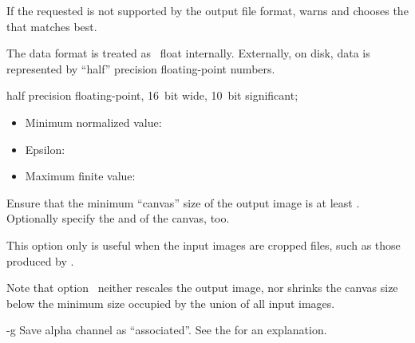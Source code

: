 \begin{codelist}
  If the requested  is not supported by the output file format, \App{} warns and
  chooses the  that matches best.

  \noindent The  data format is treated as ~float internally.
  Externally, on disk,  data is represented by ``half'' precision
  floating-point numbers.

   half precision floating-point, 16~bit wide,
  10~bit significant;

  \begin{itemize}
  \item
    Minimum normalized value: 
  \item
    Epsilon: 
  \item
    Maximum finite value: 
  \end{itemize}


  \label{opt:f}%
\item[-f \metavar{WIDTH}x\metavar{HEIGHT}%
  \optional{+x\metavar{XOFFSET}+y\metavar{YOFFSET}}]\itemend
  Ensure that the minimum ``canvas'' size of the output image is at least
  \classictimes{}.  Optionally specify the  and
   of the canvas, too.

  This option only is useful when the input images are cropped  files, such as
  those produced by .

  Note that option~ neither rescales the output image, nor shrinks the canvas size
  below the minimum size occupied by the union of all input images.


  \label{opt:g}%
\item[-g]
  Save alpha channel as ``associated''. See the
   for an explanation.


\end{codelist}
